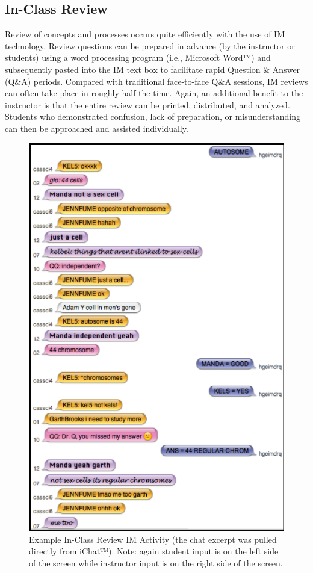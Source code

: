 \documentclass[11.5pt]{sig-alternate} %
\begin{document}
\begin{large}
\subsection*{In-Class Review}

Review of concepts and processes occurs quite efficiently with the use of IM technology. Review questions can be prepared in advance (by the instructor or students) using a word processing program (i.e., Microsoft Word™) and subsequently pasted into the IM text box to facilitate rapid Question \& Answer (Q\&A) periods. Compared with traditional face-to-face Q\&A sessions, IM reviews can often take place in roughly half the time. Again, an additional benefit to the instructor is that the entire review can be printed, distributed, and analyzed. Students who demonstrated confusion, lack of preparation, or misunderstanding can then be approached and assisted individually. 

\begin{figure}[ht]
    \centering
    \includegraphics[width=0.85\linewidth]{images/fig2.png}
    \caption{Example In-Class Review IM Activity (the chat excerpt was pulled directly from iChat™). Note: again student input is on the left side of the screen while instructor input is on the right side of the screen.}
\end{figure}


\end{large}
\end{document}
